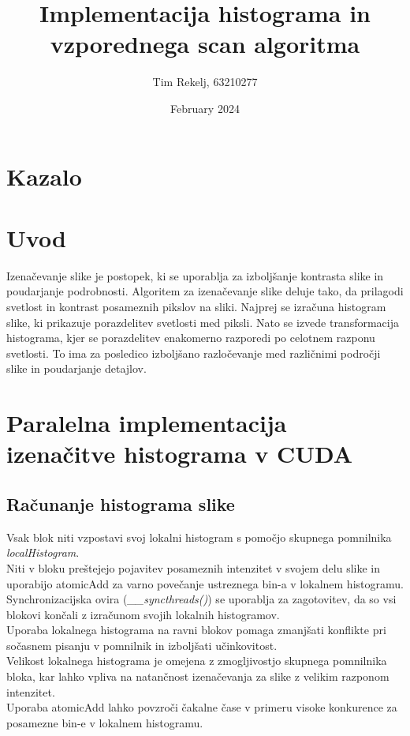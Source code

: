 \documentclass{article}
\title{Implementacija histograma in vzporednega scan algoritma}
\author{Tim Rekelj, 63210277}
\date{February 2024}
\begin{document}
\maketitle

\newpage
\section{Kazalo}
\renewcommand*\contentsname{}
\tableofcontents

\newpage
\section{Uvod}
Izenačevanje slike je postopek, ki se uporablja za izboljšanje kontrasta slike in poudarjanje podrobnosti. Algoritem za izenačevanje slike deluje tako, da prilagodi svetlost in kontrast posameznih pikslov na sliki. Najprej se izračuna histogram slike, ki prikazuje porazdelitev svetlosti med piksli. Nato se izvede transformacija histograma, kjer se porazdelitev enakomerno razporedi po celotnem razponu svetlosti. To ima za posledico izboljšano razločevanje med različnimi področji slike in poudarjanje detajlov.

\section{Paralelna implementacija izenačitve histograma v CUDA}
\subsection{Računanje histograma slike}
Vsak blok niti vzpostavi svoj lokalni histogram s pomočjo skupnega pomnilnika \textit{localHistogram}. \\
Niti v bloku preštejejo pojavitev posameznih intenzitet v svojem delu slike in uporabijo atomicAdd za varno povečanje ustreznega bin-a v lokalnem histogramu.
Synchronizacijska ovira (\textit{\_\_syncthreads()}) se uporablja za zagotovitev, da so vsi blokovi končali z izračunom svojih lokalnih histogramov.\\
Uporaba lokalnega histograma na ravni blokov pomaga zmanjšati konflikte pri sočasnem pisanju v pomnilnik in izboljšati učinkovitost.\\
Velikost lokalnega histograma je omejena z zmogljivostjo skupnega pomnilnika bloka, kar lahko vpliva na natančnost izenačevanja za slike z velikim razponom intenzitet.\\
Uporaba atomicAdd lahko povzroči čakalne čase v primeru visoke konkurence za posamezne bin-e v lokalnem histogramu.
\end{document}
